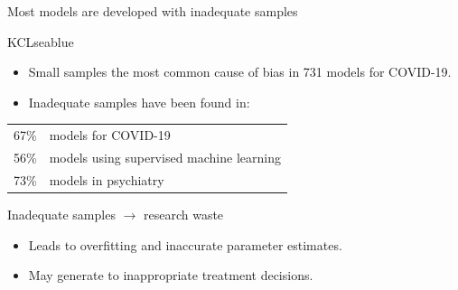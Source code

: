 \documentclass[11pt]{beamer}
\newcommand*{\tc}[2]{%
	\textcolor{#1}{#2}
}
\newcommand{\sgap}{\vspace{0.5em}}
\begin{document}
\begin{frame}[t]{Most models are developed with inadequate samples}


	\begin{cbox}[bottom=0.5mm]{KCLseablue}{}
		\begin{itemize}
			\item Small samples the most common cause of bias in 731 models
			      for COVID-19.\autocite{wynants2020}
			\item Inadequate samples have been found in: \vspace{0.5em}
		\end{itemize}
		\begin{tabular}{cl}
			{\LARGE \alert{67\%}} & models for COVID-19\autocite{wynants2020}                      \\[0.2em]
			{\LARGE \alert{56\%}} & models using supervised machine learning\autocite{navarro2021} \\[0.2em]
			{\LARGE \alert{73\%}} & models in psychiatry\autocite{meehan2022}
		\end{tabular}
	\end{cbox}


	\vspace{0.3em}
	{\Large \tc{KCLseablue}{Inadequate samples $\rightarrow$ research waste}}
	\sgap

	\begin{itemize}
		\item Leads to overfitting and inaccurate parameter estimates.


		\item May generate to inappropriate treatment decisions.


\end{itemize}
\end{frame}
\end{document}
